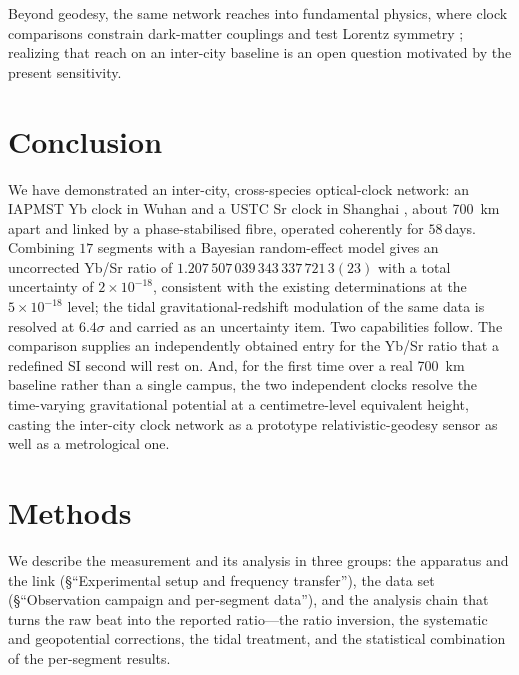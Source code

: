 \documentclass[11pt,a4paper]{article}
\newcommand{\e}[1]{\times 10^{#1}}
\begin{document}
Beyond geodesy, the same network reaches into fundamental physics, where
clock comparisons constrain dark-matter couplings \citep{wcislo2018global,
roberts2017domain} and test Lorentz symmetry \citep{sanner2019lorentz};
realizing that reach on an inter-city baseline is an open question
motivated by the present sensitivity.

\section{Conclusion}
\label{sec:conclusion}

We have demonstrated an inter-city, cross-species optical-clock network:
an IAPMST Yb clock in Wuhan \citep{zhu2026yb} and a USTC Sr clock in
Shanghai \citep{jia2026sr}, about \qty{700}{km} apart and linked by a
phase-stabilised fibre, operated coherently for $58$\,days. Combining
$17$ segments with a Bayesian random-effect model gives an uncorrected
Yb/Sr ratio of $1.207\,507\,039\,343\,337\,721\,3(23)$ with a total
uncertainty of $2\e{-18}$, consistent with the existing determinations at
the $5\e{-18}$ level; the tidal gravitational-redshift modulation of the
same data is resolved at $6.4\sigma$ and carried as an uncertainty item.
Two capabilities follow. The comparison supplies an independently
obtained entry for the Yb/Sr ratio that a redefined SI second will rest
on. And, for the first time over a real \qty{700}{km} baseline rather than a
single campus, the two independent clocks resolve the time-varying
gravitational potential at a centimetre-level equivalent height, casting
the inter-city clock network as a prototype relativistic-geodesy sensor
as well as a metrological one.

\section{Methods}

We describe the measurement and its analysis in three groups: the
apparatus and the link (§``Experimental setup and frequency transfer''),
the data set (§``Observation campaign and per-segment data''), and the
analysis chain that turns the raw beat into the reported ratio---the
ratio inversion, the systematic and geopotential corrections, the tidal
treatment, and the statistical combination of the per-segment results.
\end{document}
